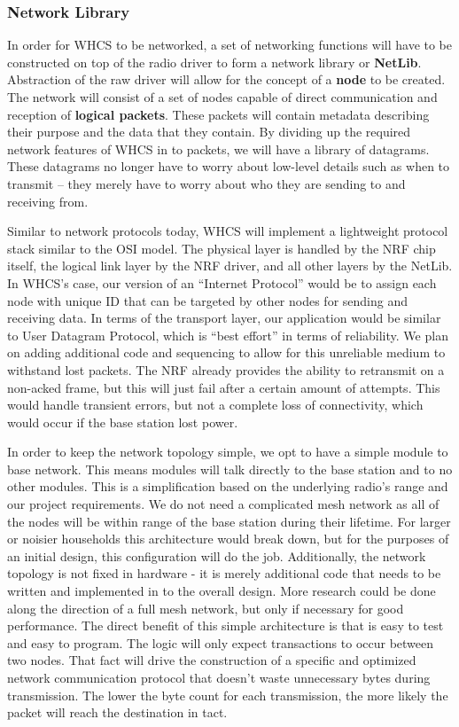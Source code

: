 \subsubsection{Network Library}
\label{sec:network-library}

In order for WHCS to be networked, a set of networking functions will have to
be constructed on top of the radio driver to form a network library or
\textbf{NetLib}. Abstraction of the raw driver will allow for the concept of a
\textbf{node} to be created. The network will consist of a set of nodes capable
of direct communication and reception of \textbf{logical packets}. These
packets will contain metadata describing their purpose and the data that they
contain. By dividing up the required network features of WHCS in to packets, we
will have a library of datagrams. These datagrams no longer have to worry about
low-level details such as when to transmit -- they merely have to worry about
who they are sending to and receiving from.

Similar to network protocols today, WHCS will implement a lightweight protocol
stack similar to the OSI model. The physical layer is handled by the NRF chip
itself, the logical link layer by the NRF driver, and all other layers by the
NetLib. In WHCS's case, our version of an ``Internet Protocol'' would be to
assign each node with unique ID that can be targeted by other nodes for sending
and receiving data. In terms of the transport layer, our application would be
similar to User Datagram Protocol, which is ``best effort'' in terms of
reliability. We plan on adding additional code and sequencing to allow for this
unreliable medium to withstand lost packets. The NRF already provides the
ability to retransmit on a non-acked frame, but this will just fail after a
certain amount of attempts. This would handle transient errors, but not a
complete loss of connectivity, which would occur if the base station lost
power.

In order to keep the network topology simple, we opt to have a simple module to
base network. This means modules will talk directly to the base station and to
no other modules. This is a simplification based on the underlying radio's
range and our project requirements. We do not need a complicated mesh network
as all of the nodes will be within range of the base station during their
lifetime. For larger or noisier households this architecture would break down,
but for the purposes of an initial design, this configuration will do the job.
Additionally, the network topology is not fixed in hardware - it is merely
additional code that needs to be written and implemented in to the overall
design. More research could be done along the direction of a full mesh network,
but only if necessary for good performance. The direct benefit of this simple
architecture is that is easy to test and easy to program. The logic will only
expect transactions to occur between two nodes. That fact will drive the
construction of a specific and optimized network communication protocol that
doesn't waste unnecessary bytes during transmission. The lower the byte count
for each transmission, the more likely the packet will reach the destination in
tact.

